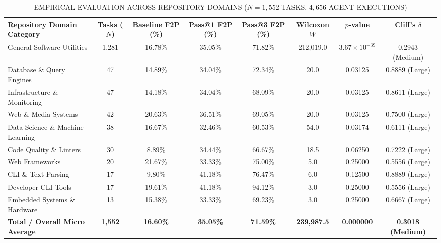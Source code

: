 \documentclass[conference]{IEEEtran}
\begin{document}
\begin{table}[htbp]
\caption{EMPIRICAL EVALUATION ACROSS REPOSITORY DOMAINS ($N=1,552$ TASKS, $4,656$ AGENT EXECUTIONS)}
\begin{center}
\begin{tabular}{|l|c|c|c|c|c|c|c|}
\hline
\textbf{Repository Domain Category} & \textbf{Tasks ($N$)} & \textbf{Baseline F2P (\%)} & \textbf{Pass@1 F2P (\%)} & \textbf{Pass@3 F2P (\%)} & \textbf{Wilcoxon $W$} & \textbf{$p$-value} & \textbf{Cliff's $\delta$} \\
\hline
General Software Utilities & 1,281 & 16.78\% & 35.05\% & 71.82\% & 212,019.0 & $3.67 \times 10^{-39}$ & 0.2943 (Medium) \\
Database \& Query Engines & 47 & 14.89\% & 34.04\% & 72.34\% & 20.0 & 0.03125 & 0.8889 (Large) \\
Infrastructure \& Monitoring & 47 & 14.18\% & 34.04\% & 68.09\% & 20.0 & 0.03125 & 0.8611 (Large) \\
Web \& Media Systems & 42 & 20.63\% & 36.51\% & 69.05\% & 20.0 & 0.03125 & 0.7500 (Large) \\
Data Science \& Machine Learning & 38 & 16.67\% & 32.46\% & 60.53\% & 54.0 & 0.03174 & 0.6111 (Large) \\
Code Quality \& Linters & 30 & 8.89\% & 34.44\% & 66.67\% & 18.5 & 0.06250 & 0.7222 (Large) \\
Web Frameworks & 20 & 21.67\% & 33.33\% & 75.00\% & 5.0 & 0.25000 & 0.5556 (Large) \\
CLI \& Text Parsing & 17 & 9.80\% & 41.18\% & 76.47\% & 6.0 & 0.12500 & 0.8889 (Large) \\
Developer CLI Tools & 17 & 19.61\% & 41.18\% & 94.12\% & 3.0 & 0.25000 & 0.5556 (Large) \\
Embedded Systems \& Hardware & 13 & 15.38\% & 33.33\% & 69.23\% & 3.0 & 0.25000 & 0.6667 (Large) \\
\hline
\textbf{Total / Overall Micro Average} & \textbf{1,552} & \textbf{16.60\%} & \textbf{35.05\%} & \textbf{71.59\%} & \textbf{239,987.5} & \textbf{0.000000} & \textbf{0.3018 (Medium)} \\
\hline
\end{tabular}
\label{tab:domain_results}
\end{center}
\end{table}
\end{document}
